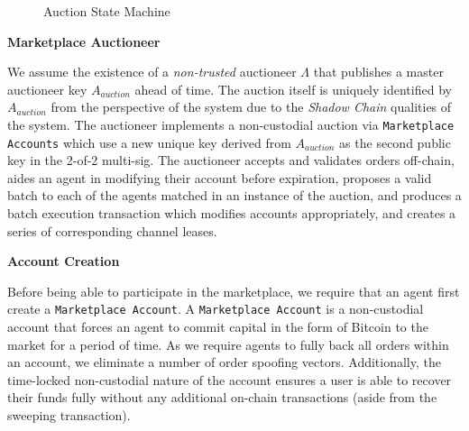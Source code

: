 \documentclass[10pt,a4paper]{article}
\theoremstyle{definition}
\begin{document}
\begin{figure}[!htb]


\caption{Auction State Machine}

\end{figure}


\begin{center}
    \textbf{Marketplace Auctioneer}
\end{center}

We assume the existence of a \emph{non-trusted} auctioneer $\Lambda$ that
publishes a master auctioneer key $A_{auction}$ ahead of time. The auction
itself is uniquely identified by $A_{auction}$ from the perspective of the
system due to the \emph{Shadow Chain} qualities of the system. The auctioneer
implements a non-custodial auction via \texttt{Marketplace Accounts} which use
a new unique key derived from $A_{auction}$ as the second public key in the
2-of-2 multi-sig. The auctioneer accepts and validates orders off-chain, aides
an agent in modifying their account before expiration, proposes a valid batch
to each of the agents matched in an instance of the auction, and produces a
batch execution transaction which modifies accounts appropriately, and creates
a series of corresponding channel leases.

\begin{center}
    \textbf{Account Creation}
\end{center}

Before being able to participate in the marketplace, we require that an agent
first create a \texttt{Marketplace Account}. A \texttt{Marketplace Account} is
a non-custodial account that forces an agent to commit capital in the form of
Bitcoin to the market for a period of time. As we require agents to fully back
all orders within an account, we eliminate a number of order spoofing vectors.
Additionally, the time-locked non-custodial nature of the account ensures a user
is able to recover their funds fully without any additional on-chain
transactions (aside from the sweeping transaction).
\end{document}
